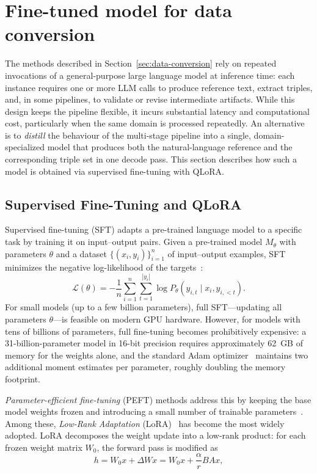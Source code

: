 \section{Fine-tuned model for data conversion}
\label{sec:finetuned-model}

The methods described in Section~\ref{sec:data-conversion} rely on repeated invocations of a general-purpose large language model at inference time: each instance requires one or more LLM calls to produce reference text, extract triples, and, in some pipelines, to validate or revise intermediate artifacts. While this design keeps the pipeline flexible, it incurs substantial latency and computational cost, particularly when the same domain is processed repeatedly. An alternative is to \emph{distill} the behaviour of the multi-stage pipeline into a single, domain-specialized model that produces both the natural-language reference and the corresponding triple set in one decode pass. This section describes how such a model is obtained via supervised fine-tuning with QLoRA.

\subsection{Supervised Fine-Tuning and QLoRA}

Supervised fine-tuning (SFT) adapts a pre-trained language model to a specific task by training it on input--output pairs. Given a pre-trained model $M_\theta$ with parameters $\theta$ and a dataset $\{(x_i, y_i)\}_{i=1}^{n}$ of input--output examples, SFT minimizes the negative log-likelihood of the targets~\cite{ouyang2022instructgpt}:
\begin{equation}
  \mathcal{L}(\theta) = -\frac{1}{n}\sum_{i=1}^{n}\sum_{t=1}^{|y_i|} \log P_\theta(y_{i,t} \mid x_i, y_{i,<t}).
\end{equation}
For small models (up to a few billion parameters), full SFT---updating all parameters $\theta$---is feasible on modern GPU hardware. However, for models with tens of billions of parameters, full fine-tuning becomes prohibitively expensive: a 31-billion-parameter model in 16-bit precision requires approximately 62~GB of memory for the weights alone, and the standard Adam optimizer~\cite{kingma2014adam} maintains two additional moment estimates per parameter, roughly doubling the memory footprint.

\emph{Parameter-efficient fine-tuning} (PEFT) methods address this by keeping the base model weights frozen and introducing a small number of trainable parameters~\cite{mangrulkar2022peft}. Among these, \emph{Low-Rank Adaptation} (LoRA)~\cite{hu2021lora} has become the most widely adopted. LoRA decomposes the weight update into a low-rank product: for each frozen weight matrix $W_0$, the forward pass is modified as
\begin{equation}
  h = W_0 x + \Delta W x = W_0 x + \frac{\alpha}{r} B A x,
\end{equation}

